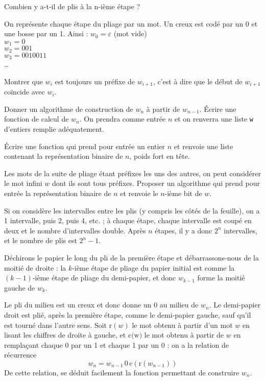 \Q
Combien y a-t-il de plis à la n-ième étape ?

\Q
On représente chaque étape du pliage par un mot. Un creux est codé par un 0 et une bosse par un 1. Ainsi : $w_0=\varepsilon$ (mot vide)\\
$w_1=0$\\
$w_2=001$\\
$w_3=0010011$\\
\dots
\medskip

Montrer que $w_i$ est toujours un préfixe de $w_{i+1}$, c'est à dire que le début de $w_{i+1}$ coïncide avec $w_i$.

\Q
Donner un algorithme de construction de $w_n$ à partir de $w_{n-1}$. Écrire une fonction de calcul de $w_n$. On prendra comme entrée $n$ et on renverra une liste \texttt{w} d'entiers remplie adéquatement.

\Q
Écrire une fonction qui prend pour entrée un entier $n$ et renvoie une liste contenant la représentation binaire de $n$, poids fort en tête.

\Q
Les mots de la suite de pliage étant préfixes les uns des autres, on peut considérer le mot infini $w$ dont ils sont tous préfixes. Proposer un algorithme qui prend pour entrée la représentation binaire de $n$ et renvoie le $n$-ième bit de $w$.

\Corrige

\Q
Si on considère les intervalles entre les plis (y compris les côtés de la feuille), on a 1 intervalle, puis 2, puis 4, etc. ; à chaque étape, chaque intervalle est coupé en deux et le nombre d'intervalles double. Après $n$ étapes, il y a donc $2^n$ intervalles, et le nombre de plis est $2^n-1$.

\Q
Déchirons le papier le long du pli de la première étape et débarrassons-nous de la moitié de droite : la $k$-ième étape de pliage du papier initial est comme la $(k-1)$-ième étape de pliage du demi-papier, et donc $w_{k-1}$ forme la moitié gauche de $w_k$.

\Q
Le pli du milieu est un creux et donc donne un 0 au milieu de $w_n$. Le demi-papier droit est plié, après la première étape, comme le demi-papier gauche, sauf qu'il est tourné dans l'autre sens. Soit $\textrm{r}(w)$ le mot obtenu à partir d'un mot $w$ en lisant les chiffres de droite à gauche, et $\textrm{c(w)}$ le mot obtenu à partir de $w$ en remplaçant chaque 0 par un 1 et chaque 1 par un 0 : on a la relation de récurrence
\[
    w_n = w_{n-1}\,0\,\textrm{c}(\textrm{r}(w_{n-1}))
\]
De cette relation, se déduit facilement la fonction permettant de construire $w_n$.

